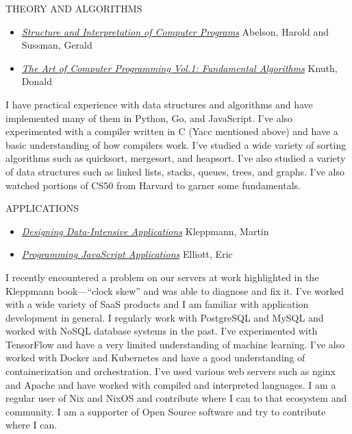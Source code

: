 \documentclass[12pt]{report}
\begin{document}
THEORY AND ALGORITHMS
\begin{itemize}
        \item \href{https://en.wikipedia.org/wiki/Structure_and_Interpretation_of_Computer_Programs}{\emph {Structure and Interpretation of Computer Programs}} Abelson, Harold and Sussman, Gerald
        \item \href{https://www-cs-faculty.stanford.edu/~knuth/taocp.html}{\emph {The Art of Computer Programming Vol.1: Fundamental Algorithms}} Knuth, Donald
\end{itemize}
I have practical experience with data structures and algorithms and have implemented many of them in Python, Go, and JavaScript. I've also experimented  with a compiler written in C (Yacc mentioned above) and have a basic understanding of how compilers work. I've studied a wide variety of sorting algorithms such as quicksort, mergesort, and heapsort. I've also studied a variety of data structures such as linked lists, stacks, queues, trees, and graphs. I've also watched portions of CS50 from Harvard to garner some fundamentals.\hfill \break

APPLICATIONS
\begin{itemize}
        \item \href{https://dataintensive.net/}{\emph {Designing Data-Intensive Applications}} Kleppmann, Martin
        \item \href{https://www.oreilly.com/library/view/programming-javascript-applications/9781491950289/}{\emph {Programming JavaScript Applications}} Elliott, Eric
\end{itemize}
I recently encountered a problem on our servers at work highlighted in the Kleppmann book---``clock skew'' and was able to diagnose and fix it. I've worked with a wide variety of SaaS products and I am familiar with application development in general.
I regularly work with PostgreSQL and MySQL and worked with NoSQL database systems in the past. I've experimented with TensorFlow and have a very limited understanding of machine learning. I've also worked with Docker and Kubernetes and have a good understanding of containerization and orchestration. I've used various web servers such as nginx and Apache and have worked with compiled and interpreted languages. I am a regular user of Nix and NixOS and contribute where I can to that ecosystem and community. I am a supporter of Open Source software and try to contribute where I can.\hfill \break
\end{document}
